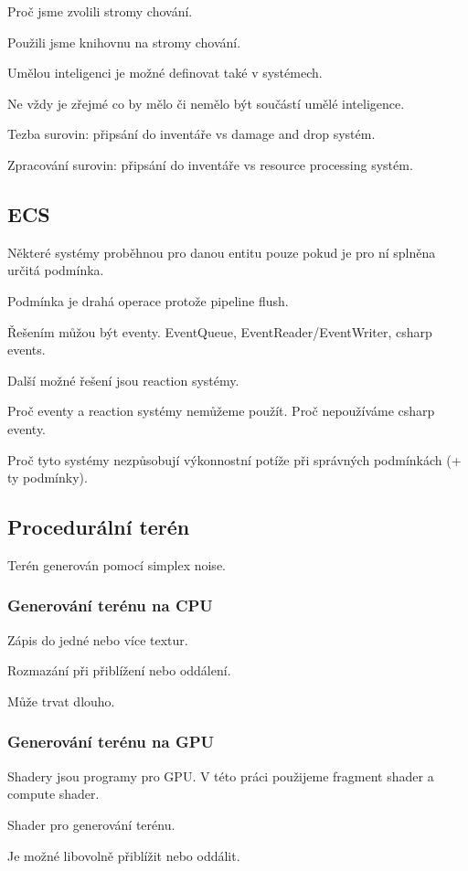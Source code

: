 Proč jsme zvolili stromy chování.

Použili jsme knihovnu na stromy chování.

Umělou inteligenci je možné definovat také v systémech.

Ne vždy je zřejmé co by mělo či nemělo být součástí umělé inteligence.

Tezba surovin: připsání do inventáře vs damage and drop systém.

Zpracování surovin: připsání do inventáře vs resource processing systém. 

\subsection{ECS}
Některé systémy proběhnou pro danou entitu pouze pokud je pro ní splněna určitá podmínka.

Podmínka je drahá operace protože pipeline flush.

Řešením můžou být eventy. EventQueue, EventReader/EventWriter, csharp events.

Další možné řešení jsou reaction systémy.

Proč eventy a reaction systémy nemůžeme použít. Proč nepoužíváme csharp eventy.

Proč tyto systémy nezpůsobují výkonnostní potíže při správných podmínkách (+ ty podmínky).

\subsection{Procedurální terén}
Terén generován pomocí simplex noise.

\subsubsection{Generování terénu na CPU}
Zápis do jedné nebo více textur.

Rozmazání při přiblížení nebo oddálení.

Může trvat dlouho.

\subsubsection{Generování terénu na GPU}
Shadery jsou programy pro GPU. V této práci použijeme fragment shader a compute shader.

Shader pro generování terénu.

Je možné libovolně přiblížit nebo oddálit.


